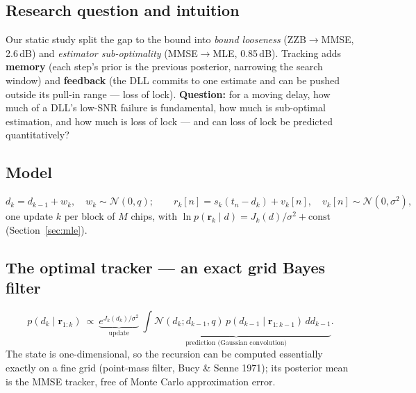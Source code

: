 \documentclass[11pt,a4paper]{article}
\newcommand{\br}{\mathbf{r}}
\begin{document}
\subsection{Research question and intuition}
Our static study split the gap to the bound into \emph{bound looseness} (ZZB$\to$MMSE, 2.6\,dB) and \emph{estimator sub-optimality}
(MMSE$\to$MLE, 0.85\,dB). Tracking adds \textbf{memory} (each step's prior is the previous posterior, narrowing the search window)
and \textbf{feedback} (the DLL commits to one estimate and can be pushed outside its pull-in range --- loss of lock).
\textbf{Question:} for a moving delay, how much of a DLL's low-SNR failure is fundamental, how much is sub-optimal estimation,
and how much is loss of lock --- and can loss of lock be predicted quantitatively?

\subsection{Model}
\begin{equation}
d_k=d_{k-1}+w_k,\quad w_k\sim\mathcal N(0,q);\qquad r_k[n]=s_k(t_n-d_k)+v_k[n],\quad v_k[n]\sim\mathcal N(0,\sigma^2),
\end{equation}
one update $k$ per block of $M$ chips, with $\ln p(\br_k\mid d)=J_k(d)/\sigma^2+\text{const}$ (Section~\ref{sec:mle}).

\subsection{The optimal tracker --- an exact grid Bayes filter}
\begin{equation}
p(d_k\mid\br_{1:k})\ \propto\ \underbrace{e^{J_k(d_k)/\sigma^2}}_{\text{update}}\ \underbrace{\int\mathcal N(d_k;d_{k-1},q)\,p(d_{k-1}\mid\br_{1:k-1})\,dd_{k-1}}_{\text{prediction (Gaussian convolution)}}.
\end{equation}
The state is one-dimensional, so the recursion can be computed essentially exactly on a fine grid (point-mass filter, Bucy
\& Senne 1971); its posterior mean is the MMSE tracker, free of Monte Carlo approximation error.
\end{document}

